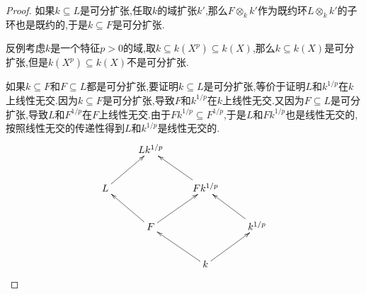 \begin{enumerate}
\begin{proof}
		如果$k\subseteq L$是可分扩张,任取$k$的域扩张$k'$,那么$F\otimes_kk'$作为既约环$L\otimes_kk'$的子环也是既约的,于是$k\subseteq F$是可分扩张.
		
		\qquad
		
		反例考虑$k$是一个特征$p>0$的域,取$k\subseteq k(X^p)\subseteq k(X)$,那么$k\subseteq k(X)$是可分扩张,但是$k(X^p)\subseteq k(X)$不是可分扩张.
		
		\qquad
		
		如果$k\subseteq F$和$F\subseteq L$都是可分扩张,要证明$k\subseteq L$是可分扩张,等价于证明$L$和$k^{1/p}$在$k$上线性无交.因为$k\subseteq F$是可分扩张,导致$F$和$k^{1/p}$在$k$上线性无交.又因为$F\subseteq L$是可分扩张,导致$L$和$F^{1/p}$在$F$上线性无交.由于$Fk^{1/p}\subseteq F^{1/p}$,于是$L$和$Fk^{1/p}$也是线性无交的,按照线性无交的传递性得到$L$和$k^{1/p}$是线性无交的.
		$$\xymatrix{&Lk^{1/p}&&\\L\ar[ur]&&Fk^{1/p}\ar[ul]&\\&F\ar[ul]\ar[ur]&&k^{1/p}\ar[ul]\\&&k\ar[ul]\ar[ur]&}$$
	\end{proof}
\end{enumerate}

